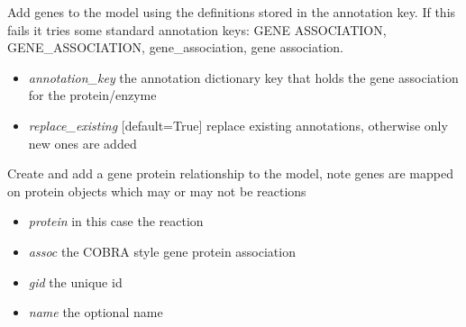 \documentclass[a4paper,11pt,english]{sphinxmanual}
\begin{document}
\begin{fulllineitems}
\begin{fulllineitems}
\begin{itemize}
\end{itemize}

\end{fulllineitems}


\begin{fulllineitems}
\label{modules_doc:cbmpy.CBModel.Model.createGeneAssociationsFromAnnotations}
Add genes to the model using the definitions stored in the annotation key. If this fails it tries some standard annotation
keys: GENE ASSOCIATION, GENE\_ASSOCIATION, gene\_association, gene association.
\begin{itemize}
\item {} 
\emph{annotation\_key} the annotation dictionary key that holds the gene association for the protein/enzyme

\item {} 
\emph{replace\_existing} {[}default=True{]} replace existing annotations, otherwise only new ones are added

\end{itemize}

\end{fulllineitems}


\begin{fulllineitems}
\label{modules_doc:cbmpy.CBModel.Model.createGeneProteinAssociation}
Create and add a gene protein relationship to the model, note genes are mapped on protein objects which may or may not be reactions
\begin{itemize}
\item {} 
\emph{protein} in this case the reaction

\item {} 
\emph{assoc} the COBRA style gene protein association

\item {} 
\emph{gid} the unique id

\item {} 
\emph{name} the optional name


\end{itemize}
\end{fulllineitems}
\end{fulllineitems}
\end{document}
